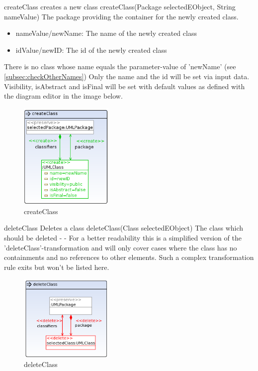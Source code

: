 \op
{createClass}
{creates a new class}
{createClass(Package selectedEObject, String nameValue)}
{The package providing the container for the newly created class.}
{
\begin{itemize}
 \item nameValue/newName: The name of the newly created class
 \item idValue/newID: The id of the newly created class
\end{itemize}
}
{There is no class whose name equals the parameter-value of 'newName' (see
\ref{subsec:checkOtherNames})}
{Only the name and the id will be set via input data. Visibility, isAbstract and
isFinal will be set with default values as defined with the diagram editor in
the image below.} \begin{figure}[H]
  \centering
  \includegraphics[width=0.4\textwidth]{pics/createClass.png}
  \caption{createClass}
  \label{createClass}
\end{figure}
\op
{deleteClass}
{Deletes a class}
{deleteClass(Class selectedEObject)}
{The class which should be deleted}
{-}
{-}
{For a better readability this is a simplified version of the
'deleteClass'-transformation and will only cover cases where the class
has no containments and no references to other elements. Such a complex
transformation rule exits but won't be listed here.}
\begin{figure}[H]
  \centering
  \includegraphics[width=0.4\textwidth]{pics/deleteClass_emptyAndUnreferenced.png}
  \caption{deleteClass}
  \label{deleteClass}
\end{figure}

